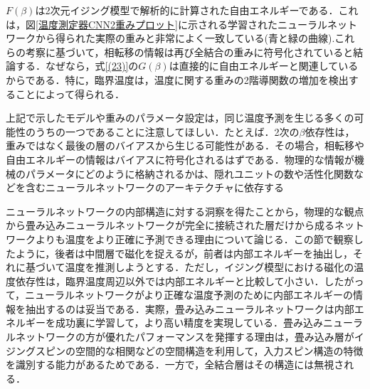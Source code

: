 \documentclass[a4paper,11pt]{jsreport}
\begin{document}
$F(\beta)$は2次元イジング模型で解析的に計算された自由エネルギーである．これは，図\ref{温度測定器CNN2重みプロット}に示される学習されたニューラルネットワークから得られた実際の重みと非常によく一致している(青と緑の曲線).これらの考察に基づいて，相転移の情報は再び全結合の重みに符号化されていると結論する．なぜなら，式\ref{(23)}の$G(\beta)$は直接的に自由エネルギーと関連しているからである．特に，臨界温度は，温度に関する重みの2階導関数の増加を検出することによって得られる．\par
上記で示したモデルや重みのパラメータ設定は，同じ温度予測を生じる多くの可能性のうちの一つであることに注意してほしい．たとえば．2次の$\beta$依存性は，重みではなく最後の層のバイアスから生じる可能性がある．その場合，相転移や自由エネルギーの情報はバイアスに符号化されるはずである．物理的な情報が機械のパラメータにどのように格納されるかは、隠れユニットの数や活性化関数などを含むニューラルネットワークのアーキテクチャに依存する\par
ニューラルネットワークの内部構造に対する洞察を得たことから，物理的な観点から畳み込みニューラルネットワークが完全に接続された層だけから成るネットワークよりも温度をより正確に予測できる理由について論じる．この節で観察したように，後者は中間層で磁化を捉えるが，前者は内部エネルギーを抽出し，それに基づいて温度を推測しようとする．ただし，イジング模型における磁化の温度依存性は，臨界温度周辺以外では内部エネルギーと比較して小さい．したがって，ニューラルネットワークがより正確な温度予測のために内部エネルギーの情報を抽出するのは妥当である．実際，畳み込みニューラルネットワークは内部エネルギーを成功裏に学習して，より高い精度を実現している．畳み込みニューラルネットワークの方が優れたパフォーマンスを発揮する理由は，畳み込み層がイジングスピンの空間的な相関などの空間構造を利用して，入力スピン構造の特徴を識別する能力があるためである．一方で，全結合層はその構造には無視される．\par
\end{document}
